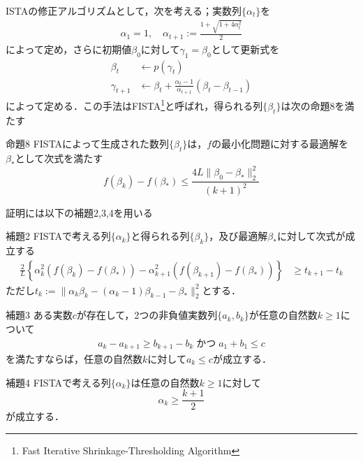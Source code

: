\documentclass{jsarticle}
\theoremstyle{definition}
\theoremstyle{mystyle} %
\begin{document}
ISTAの修正アルゴリズムとして，次を考える；実数列$\{\alpha_t\}$を
\begin{align*}
\alpha_1=1,\quad \alpha_{t+1}:=\frac{1+\sqrt{1+4\alpha_t^2}}{2}
\end{align*}
によって定め，さらに初期値$\beta_0$に対して$\gamma_1=\beta_0$として更新式を
\begin{align*}
\beta_t&\leftarrow p(\gamma_t)\\
\gamma_{t+1}&\leftarrow \beta_t+\frac{\alpha_t-1}{\alpha_{t+1}}(\beta_t-\beta_{t-1})
\end{align*}
によって定める．この手法はFISTA\footnote{Fast Iterative Shrinkage-Thresholding Algorithm}と呼ばれ，得られる列$\{\beta_t\}$は次の命題8を満たす
\begin{itembox}[l]{命題8}
FISTAによって生成された数列$\{\beta_t\}$は，$f$の最小化問題に対する最適解を$\beta_{\ast}$として次式を満たす
$$f(\beta_k)-f(\beta_{\ast})\leq \frac{4L\|\beta_0-\beta_{\ast}\|_2^2}{(k+1)^2}$$
\end{itembox}
証明には以下の補題2,3,4を用いる
\begin{itembox}[l]{補題2}
FISTAで考える列$\{\alpha_k\}$と得られる列$\{\beta_k\}$，及び最適解$\beta_{\ast}$に対して次式が成立する
\begin{align*}
\frac{2}{L}\left\{\alpha_k^2(f(\beta_k)-f(\beta_{\ast}))-\alpha_{k+1}^2(f(\beta_{k+1})-f(\beta_{\ast}))\right\}&\geq t_{k+1}-t_k
\end{align*}
ただし$t_k:=\|\alpha_k\beta_k-(\alpha_k-1)\beta_{k-1}-\beta_{\ast}\|_2^2$とする．
\end{itembox}
\begin{itembox}[l]{補題3}
ある実数$c$が存在して，2つの非負値実数列$\{a_k,b_k\}$が任意の自然数$k\geq 1$について
\begin{align*}
a_k-a_{k+1}\geq b_{k+1}-b_k\;かつ\; a_1+b_1\leq c
\end{align*}
を満たすならば，任意の自然数$k$に対して$a_k\leq c$が成立する．
\end{itembox}
\begin{itembox}[l]{補題4}
FISTAで考える列$\{\alpha_k\}$は任意の自然数$k\geq 1$に対して
$$\alpha_k\geq \frac{k+1}{2}$$
が成立する．
\end{itembox}
\end{document}
